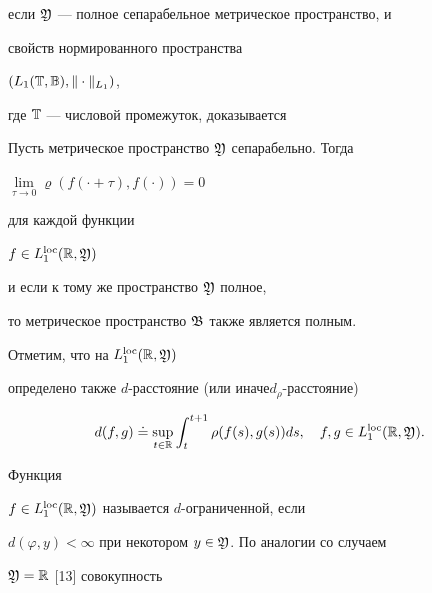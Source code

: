 если $\frak Y$ --- полное сепарабельное метрическое пространство, и


свойств нормированного пространства


$(L_1(\Bbb T,\Bbb B),\|\cdot\|_{L_1})$,


где $\Bbb T$ --- числовой промежуток, доказывается








\begin{thms}


Пусть метрическое пространство $\frak Y$ сепарабельно. Тогда


$\lim\limits_{\tau\to0}


\varrho(f(\cdot+{\tau}),f(\cdot)){=}0$


для каждой функции


$f\in L_1^{\operatorname{loc}}(\Bbb R,\frak Y)$ 


и если к тому же пространство $\frak Y$ полное,


то метрическое пространство $\frak B$ также является полным.


\end{thms}








\begin{notes}


Отметим, что на $L_1^{\operatorname{loc}}(\Bbb R,\frak Y)$


определено также $d$-расстояние (или иначе\linebreak $d_{\rho}$-расстояние)


\begin{equation}


d(f,g)\doteq\sup_{t\in\Bbb R}\int_t^{t+1}\rho(f(s),g(s))ds,


\quad f,g\in L_1^{\loc}(\Bbb R,\frak Y).


\end{equation}


\end{notes}





Функция


$f\in L_1^{\operatorname{loc}}(\Bbb R,\frak Y)$ называется $d$-ограниченной, если


$d(\varphi,y){<}\infty$ при некотором $y\in\frak Y$. По аналогии со случаем


$\frak Y=\Bbb R$ [13] совокупность


